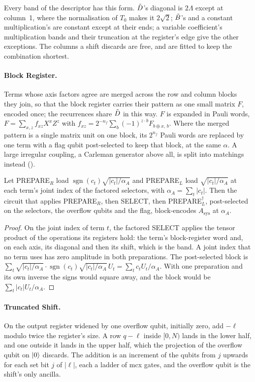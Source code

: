 Every band of the descriptor has this form. $\tilde{D}$'s diagonal is $2\Lambda$ except at column~1, where the normalisation of $T_0$ makes it $2\sqrt2$; $\tilde{B}$'s and a constant multiplication's are constant except at their ends; a variable coefficient's multiplication bands and their truncation at the register's edge give the other exceptions. The columns a shift discards are free, and are fitted to keep the combination shortest.

\paragraph{Block Register.} Terms whose axis factors agree are merged across the row and column blocks they join, so that the block register carries their pattern as one small matrix $F$, encoded once; the recurrences share $\tilde{D}$ in this way. $F$ is expanded in Pauli words, $F=\sum_{x,z}f_{xz}X^xZ^z$ with $f_{xz}=2^{-n_f}\sum_b(-1)^{z\cdot b}F_{b\oplus x,\,b}$. Where the merged pattern is a single matrix unit on one block, its $2^{n_f}$ Pauli words are replaced by one term with a flag qubit post-selected to keep that block, at the same $\alpha$. A large irregular coupling, a Carleman generator above all, is split into matchings instead ().

\begin{proposition}[Compilation]
\label{prop:term-ir-compilation}
Let PREPARE$_R$ load $\operatorname{sgn}(c_t)\sqrt{|c_t|/\alpha_A}$ and PREPARE$_L$ load $\sqrt{|c_t|/\alpha_A}$ at each term's joint index of the factored selectors, with $\alpha_A=\sum_t|c_t|$. Then the circuit that applies PREPARE$_R$, then SELECT, then PREPARE$_L^\dagger$, post-selected on the selectors, the overflow qubits and the flag, block-encodes $A_{\mathrm{sys}}$ at $\alpha_A$.
\end{proposition}
\begin{proof}
On the joint index of term $t$, the factored SELECT applies the tensor product of the operations its registers hold: the term's block-register word and, on each axis, its diagonal and then its shift, which is the band. A joint index that no term uses has zero amplitude in both preparations. The post-selected block is $\sum_t\sqrt{|c_t|/\alpha_A}\cdot\operatorname{sgn}(c_t)\sqrt{|c_t|/\alpha_A}\,U_t=\sum_tc_tU_t/\alpha_A$. With one preparation and its own inverse the signs would square away, and the block would be $\sum_t|c_t|U_t/\alpha_A$.
\end{proof}

\paragraph{Truncated Shift.} On the output register widened by one overflow qubit, initially zero, add $-\ell$ modulo twice the register's size. A row $q-\ell$ inside $[0,N)$ lands in the lower half, and one outside it lands in the upper half, which the projection of the overflow qubit on $\ket0$ discards. The addition is an increment of the qubits from $j$ upwards for each set bit $j$ of $|\ell|$, each a ladder of \gls{mcx} gates, and the overflow qubit is the shift's only ancilla.

